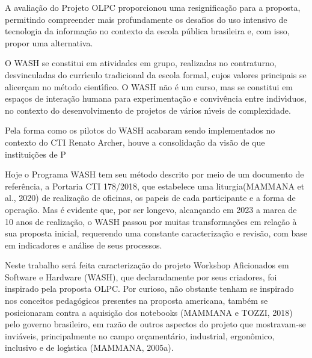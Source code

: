 \documentclass[
12pt,		%
openright,	%
twoside,  %
a4paper,			%
chapter=TITLE,		%
english,			%
french,				%
spanish,			%
brazil				%
]{USPSC-classe/USPSC}
\begin{document}
A avalia\c{c}\~ao do Projeto OLPC proporcionou uma resignifica\c{c}\~ao para a proposta, permitindo compreender mais profundamente os desafios do uso intensivo de tecnologia da informa\c{c}\~ao no contexto da escola p\'ublica brasileira e, com isso, propor uma alternativa.









O WASH se constitui em atividades em grupo, realizadas no contraturno, desvinculadas do curr\'{\i}culo tradicional da escola formal, cujos valores principais se alicer\c{c}am no m\'etodo cient\'{\i}fico. O WASH n\~ao \'e um curso, mas se constitui em espa\c{c}os de intera\c{c}\~ao humana para experimenta\c{c}\~ao e conviv\^encia entre indiv\'{\i}duos, no contexto do desenvolvimento de projetos de v\'arios n\'{\i}veis de complexidade.









Pela forma como os pilotos do WASH acabaram sendo implementados no contexto do CTI Renato Archer, houve a consolida\c{c}\~ao da vis\~ao de que institui\c{c}\~oes de P









Hoje o Programa WASH tem seu m\'etodo descrito por meio de um documento de refer\^encia, a Portaria CTI 178/2018, que estabelece uma \textquotedbl liturgia\textquotedbl   (MAMMANA et al., 2020) de realiza\c{c}\~ao de oficinas, os papeis de cada participante e a forma de opera\c{c}\~ao. Mas \'e evidente que, por ser longevo, alcan\c{c}ando em 2023 a marca de 10 anos de realiza\c{c}\~ao, o WASH passou por muitas transforma\c{c}\~oes em rela\c{c}\~ao \`a sua proposta inicial, requerendo uma constante caracteriza\c{c}\~ao e revis\~ao, com base em indicadores e an\'alise de seus processos.









Neste trabalho ser\'a feita caracteriza\c{c}\~ao do projeto Workshop Aficionados em Software e Hardware (WASH), que declaradamente por seus criadores, foi inspirado pela proposta OLPC. Por curioso, n\~ao obstante tenham se inspirado nos conceitos pedag\'ogicos presentes na proposta americana, tamb\'em se posicionaram contra a aquisi\c{c}\~ao dos notebooks  (MAMMANA e TOZZI, 2018) pelo governo brasileiro, em raz\~ao de outros aspectos do projeto que mostravam-se invi\'aveis, principalmente no campo or\c{c}ament\'ario, industrial, ergon\^omico, inclusivo e de log\'{\i}stica  (MAMMANA, 2005a).
\end{document}
